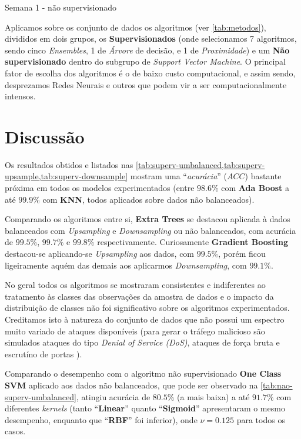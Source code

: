 \documentclass[twoside]{article}
\begin{document}
\begin{table}\scriptsize
    \centering
    
    \caption{Semana 1 - não supervisionado}
    \label{tab:nao-superv-umbalanced}
\normalsize\end{table}

Aplicamos sobre os conjunto de dados os algoritmos (ver \cref{tab:metodos}), divididos em dois grupos, os \textbf{Supervisionados} (onde selecionamos 7 algoritmos, sendo cinco \textit{Ensembles}, 1 de \textit{Árvore} de decisão, e 1 de \textit{Proximidade}) e um \textbf{Não supervisionado} dentro do subgrupo de \textit{Support Vector Machine}. O principal fator de escolha dos algoritmos é o de baixo custo computacional, e assim sendo, desprezamos Redes Neurais e outros que podem vir a ser computacionalmente intensos.

\section{Discussão}

Os resultados obtidos e listados nas \cref{tab:superv-umbalanced,tab:superv-upsample,tab:superv-downsample} mostram uma ``\textit{acurácia}'' ($ACC$) bastante próxima em todos os modelos experimentados (entre $98.6\%$ com \textbf{Ada Boost} a até $99.9\%$ com \textbf{KNN}, todos aplicados sobre dados não balanceados). 
    
Comparando os algoritmos entre si, \textbf{Extra Trees} se destacou aplicada à dados balanceados com \textit{Upsampling} e \textit{Downsampling} ou não balanceados, com acurácia de $99.5\%$, $99.7\%$ e $99.8\%$ respectivamente. Curiosamente \textbf{Gradient Boosting} destacou-se aplicando-se \textit{Upsampling} aos dados, com $99.5\%$, porém ficou ligeiramente aquém das demais aos aplicarmos \textit{Downsampling}, com $99.1\%$.

No geral todos os algoritmos se mostraram consistentes e indiferentes ao tratamento às classes das observações da amostra de dados e o impacto da distribuição de classes não foi significativo sobre os algoritmos experimentados. Creditamos isto à natureza do conjunto de dados que não possui um espectro muito variado de ataques disponíveis (para gerar o tráfego malicioso são simulados ataques do tipo \textit{Denial of Service (DoS)}, ataques de força bruta e escrutíno de portas \cite{ring2017creation,ring2017flow}).

Comparando o desempenho com o algoritmo não supervisionado \textbf{One Class SVM} aplicado aos dados não balanceados, que pode ser observado na \cref{tab:nao-superv-umbalanced}, atingiu acurácia de $80.5\%$ (a mais baixa) a até $91.7\%$ com diferentes \textit{kernels} (tanto ``\textbf{Linear}'' quanto ``\textbf{Sigmoid}'' apresentaram o mesmo desempenho, enquanto que ``\textbf{RBF}'' foi inferior), onde $\nu = 0.125$ para todos os casos.
\end{document}
